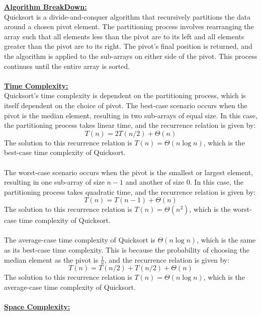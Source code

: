 \documentclass[a4paper,10pt,twocolumn]{article}
\begin{document}
\underline{\bf {Algorithm BreakDown:}}\\
Quicksort is a divide-and-conquer algorithm that recursively partitions the data around a chosen pivot element. The partitioning process involves rearranging the array such that all elements less than the pivot are to its left and all elements greater than the pivot are to its right. The pivot's final position is returned, and the algorithm is applied to the sub-arrays on either side of the pivot. This process continues until the entire array is sorted.\\\\
\underline{\bf {Time Complexity:}}\\
Quicksort's time complexity is dependent on the partitioning process, which is itself dependent on the choice of pivot. The best-case scenario occurs when the pivot is the median element, resulting in two sub-arrays of equal size. In this case, the partitioning process takes linear time, and the recurrence relation is given by:
\begin{equation}
T(n) = 2T(n/2) + \Theta(n)
\end{equation}
The solution to this recurrence relation is $T(n) = \Theta(n\log n)$, which is the best-case time complexity of Quicksort.\\\\
The worst-case scenario occurs when the pivot is the smallest or largest element, resulting in one sub-array of size $n-1$ and another of size $0$. In this case, the partitioning process takes quadratic time, and the recurrence relation is given by:
\begin{equation}
T(n) = T(n-1) + \Theta(n)
\end{equation}
The solution to this recurrence relation is $T(n) = \Theta(n^2)$, which is the worst-case time complexity of Quicksort.\\\\
The average-case time complexity of Quicksort is $\Theta(n\log n)$, which is the same as its best-case time complexity. This is because the probability of choosing the median element as the pivot is $\frac{1}{n}$, and the recurrence relation is given by:
\begin{equation}
T(n) = T(n/2) + T(n/2) + \Theta(n)
\end{equation}
The solution to this recurrence relation is $T(n) = \Theta(n\log n)$, which is the average-case time complexity of Quicksort.\\\\
\underline{\bf {Space Complexity:}}\\
\end{document}
